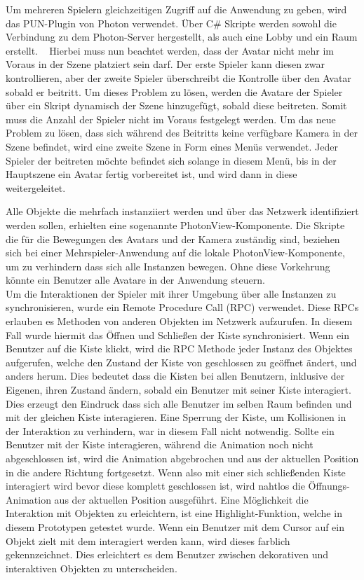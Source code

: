 Um mehreren Spielern gleichzeitigen Zugriff auf die Anwendung zu geben, wird das PUN-Plugin von Photon verwendet. Über C\# Skripte werden sowohl die Verbindung zu dem Photon-Server hergestellt, als auch eine Lobby und ein Raum erstellt. ~\parencite{InfoGamer2018}
Hierbei muss nun beachtet werden, dass der Avatar nicht mehr im Voraus in der Szene platziert sein darf. Der erste Spieler kann diesen zwar kontrollieren, aber der zweite Spieler überschreibt die Kontrolle über den Avatar sobald er beitritt. Um dieses Problem zu lösen, werden die Avatare der Spieler über ein Skript dynamisch der Szene hinzugefügt, sobald diese beitreten. Somit muss die Anzahl der Spieler nicht im Voraus festgelegt werden. Um das neue Problem zu lösen, dass sich während des Beitritts keine verfügbare Kamera in der Szene befindet, wird eine zweite Szene in Form eines Menüs verwendet. Jeder Spieler der beitreten möchte befindet sich solange in diesem Menü, bis in der Hauptszene ein Avatar fertig vorbereitet ist, und wird dann in diese weitergeleitet. \newline

Alle Objekte die mehrfach instanziiert werden und über das Netzwerk identifiziert werden sollen, erhielten eine sogenannte PhotonView-Komponente. Die Skripte die für die Bewegungen des Avatars und der Kamera zuständig sind, beziehen sich bei einer Mehrspieler-Anwendung auf die lokale PhotonView-Komponente, um zu verhindern dass sich alle Instanzen bewegen. Ohne diese Vorkehrung könnte ein Benutzer alle Avatare in der Anwendung steuern. \\

Um die Interaktionen der Spieler mit ihrer Umgebung über alle Instanzen zu synchronisieren, wurde ein Remote Procedure Call (RPC) verwendet. Diese RPCs erlauben es Methoden von anderen Objekten im Netzwerk aufzurufen. In diesem Fall wurde hiermit das Öffnen und Schließen der Kiste synchronisiert. Wenn ein Benutzer auf die Kiste klickt, wird die RPC Methode jeder Instanz des Objektes aufgerufen, welche den Zustand der Kiste von geschlossen zu geöffnet ändert, und anders herum. Dies bedeutet dass die Kisten bei allen Benutzern, inklusive der Eigenen, ihren Zustand ändern, sobald ein Benutzer mit seiner Kiste interagiert. Dies erzeugt den Eindruck dass sich alle Benutzer im selben Raum befinden und mit der gleichen Kiste interagieren. Eine Sperrung der Kiste, um Kollisionen in der Interaktion zu verhindern, war in diesem Fall nicht notwendig. Sollte ein Benutzer mit der Kiste interagieren, während die Animation noch nicht abgeschlossen ist, wird die Animation abgebrochen und aus der aktuellen Position in die andere Richtung fortgesetzt. Wenn also mit einer sich schließenden Kiste interagiert wird bevor diese komplett geschlossen ist, wird nahtlos die Öffnungs-Animation aus der aktuellen Position ausgeführt. \newline 
Eine Möglichkeit die Interaktion mit Objekten zu erleichtern, ist eine Highlight-Funktion, welche in diesem Prototypen getestet wurde. Wenn ein Benutzer mit dem Cursor auf ein Objekt zielt mit dem interagiert werden kann, wird dieses farblich gekennzeichnet. Dies erleichtert es dem Benutzer zwischen dekorativen und interaktiven Objekten zu unterscheiden.


